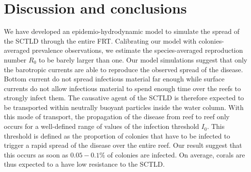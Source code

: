 \documentclass[utf8]{frontiersSCNS}
\begin{document}


\section{Discussion and conclusions}


We have developed an epidemio-hydrodynamic model to simulate the spread of the SCTLD through the entire FRT. Calibrating our model with colonies-averaged prevalence observations, we estimate the species-averaged reproduction number $R_0$ to be barely larger than one. Our model simulations suggest that only the barotropic currents are able to reproduce the observed spread of the disease. Bottom current do not spread infectious material far enough while surface currents do not allow infectious material to spend enough time over the reefs to strongly infect them. The causative agent of the SCTLD is therefore expected to be transported within neutrally buoyant particles inside the water column. With this mode of transport, the propagation of the disease from reef to reef only occurs for a well-defined range of values of the infection threshold $I_0$. This threshold is defined as the proportion of colonies that have to be infected to trigger a rapid spread of the disease over the entire reef. Our result suggest that this occurs as soon as $0.05-0.1\%$ of colonies are infected. On average, corals are thus expected to a have low resistance to the SCTLD.

\end{document}
